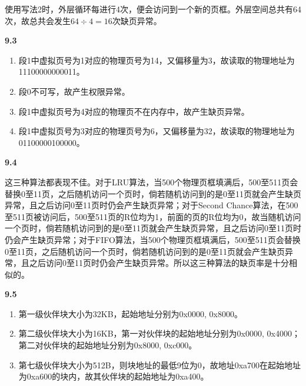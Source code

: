 \documentclass[UTF8]{report}
\begin{document}
使用写法2时，外层循环每进行4次，便会访问到一个新的页框。外层空间总共有64次，故总共会发生$64 \div 4 = 16$次缺页异常。

\noindent
\textbf{9.3}

\begin{enumerate}
  \item 段1中虚拟页号为1对应的物理页号为14，又偏移量为3，故读取的物理地址为11100000000011。
  \item 段0不可写，故产生权限异常。
  \item 段1中虚拟页号为4对应的物理页不在内存中，故产生缺页异常。
  \item 段1中虚拟页号为3对应的物理页号为6，又偏移量为32，故读取的物理地址为01100000100000。
\end{enumerate}

\noindent
\textbf{9.4}

这三种算法都表现不佳。对于LRU算法，当500个物理页框填满后，500至511页会替换0至11页，之后随机访问一个页时，倘若随机访问到的是0至11页就会产生缺页异常，且之后访问0至11页时仍会产生缺页异常；对于Second Chance算法，在500至511页被访问后，500至511页的R位均为1，前面的页的R位均为0，故当随机访问一个页时，倘若随机访问到的是0至11页就会产生缺页异常，且之后访问0至11页时仍会产生缺页异常；对于FIFO算法，当500个物理页框填满后，500至511页会替换0至11页，之后随机访问一个页时，倘若随机访问到的是0至11页就会产生缺页异常，且之后访问0至11页时仍会产生缺页异常。所以这三种算法的缺页率是十分相似的。

\noindent
\textbf{9.5}

\begin{enumerate}[label=(\arabic*)]
  \item 第一级伙伴块大小为32KB，起始地址分别为0x0000, 0x8000。
  \item 第二级伙伴块大小为16KB，第一对伙伴块的起始地址分别为0x0000, 0x4000；第二对伙伴块的起始地址分别为0x8000, 0xc000。
  \item 第七级伙伴块大小为512B，则块地址的最低9位为0，故地址0xa700在起始地址为0xa600的块内，故其伙伴块的起始地址为0xa400。
\end{enumerate}
\end{document}
